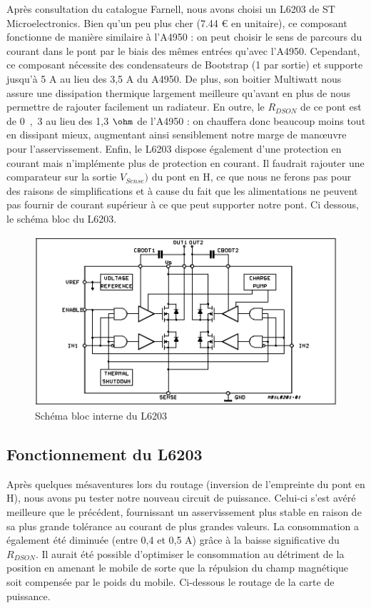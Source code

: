 \documentclass[11pt, french]{article} %
\begin{document}
Après consultation du catalogue Farnell, nous avons choisi un L6203 de ST Microelectronics. Bien qu'un peu plus cher (7.44 \euro{} en unitaire), ce composant fonctionne de manière similaire à l'A4950 : on peut choisir le sens de parcours du courant dans le pont par le biais des mêmes entrées qu'avec l'A4950. Cependant, ce composant nécessite des condensateurs de Bootstrap (1 par sortie) et supporte jusqu'à 5 A au lieu des 3,5 A du A4950. De plus, son boitier Multiwatt nous assure une dissipation thermique largement meilleure qu'avant en plus de nous permettre de rajouter facilement un radiateur. En outre, le $R_{DSON}$ de ce pont est de \unit{0,3}{\ohm} au lieu des 1,3 $\ohm$ de l'A4950 : on chauffera donc beaucoup moins tout en dissipant mieux, augmentant ainsi sensiblement notre marge de manœuvre pour l'asservissement. Enfin, le L6203 dispose également d'une protection en courant mais n'implémente plus de protection en courant. Il faudrait rajouter une comparateur sur la sortie $V_{Sense})$ du pont en H, ce que nous ne ferons pas pour des raisons de simplifications et à cause du fait que les alimentations ne peuvent pas fournir de courant supérieur à ce que peut supporter notre pont. 
Ci dessous, le schéma bloc du L6203. 

\begin{figure}[h!]
	\centering
	\includegraphics[width = 12cm]{SolutionNumerique/fonc_sch.png} 
	\caption{Schéma bloc interne du L6203}
\end{figure}

\subsection{Fonctionnement du L6203}

Après quelques mésaventures lors du routage (inversion de l'empreinte du pont en H), nous avons pu tester notre nouveau circuit de puissance. Celui-ci s'est avéré meilleure que le précédent, fournissant un asservissement plus stable en raison de sa plus grande tolérance au courant de plus grandes valeurs. La consommation a également été diminuée (entre 0,4 et 0,5 A) grâce à la baisse significative du $R_{DSON}$. Il aurait été possible d'optimiser le consommation au détriment de la position en amenant le mobile de sorte que la répulsion du champ magnétique soit compensée par le poids du mobile. Ci-dessous le routage de la carte de puissance. 
\end{document}

